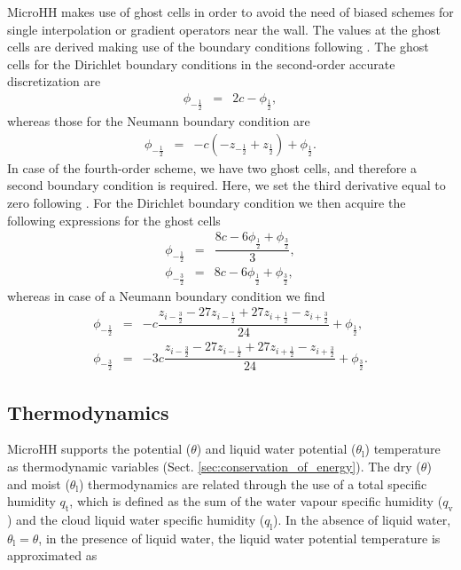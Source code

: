 \documentclass[gmd,manuscript]{copernicus}
\begin{document}
MicroHH makes use of ghost cells in order to avoid the need of biased schemes for single interpolation or gradient operators near the wall. The values at the ghost cells are derived making use of the boundary conditions following \citet{Morinishi1998}. The ghost cells for the Dirichlet boundary conditions in the second-order accurate discretization are
\begin{eqnarray}
\phi_{-\frac{1}{2}} & = & 2 c - \phi_{\frac{1}{2}},
\end{eqnarray}
whereas those for the Neumann boundary condition are
\begin{eqnarray}
\phi_{-\frac{1}{2}} & = & -c \left( - z_{-\frac{1}{2}} + z_{\frac{1}{2}} \right) + \phi_{\frac{1}{2}}.
\end{eqnarray}
In case of the fourth-order scheme, we have two ghost cells, and therefore a second boundary condition is required. Here, we set the third derivative equal to zero following \citep{Morinishi1998}. For the Dirichlet boundary condition we then acquire the following expressions for the ghost cells
\begin{eqnarray}
\phi_{-\frac{1}{2}} & = & \dfrac{8 c - 6 \phi_{\frac{1}{2}} + \phi_{\frac{3}{2}}}{3},\\
\phi_{-\frac{3}{2}} & = & 8 c - 6 \phi_{\frac{1}{2}} + \phi_{\frac{3}{2}},
\end{eqnarray}
whereas in case of a Neumann boundary condition we find
\begin{eqnarray}
\phi_{-\frac{1}{2}} & = & -c  \dfrac{z_{i-\frac{3}{2}} - 27 z_{i-\frac{1}{2}} + 27 z_{i+\frac{1}{2}} - z_{i+\frac{3}{2}}}{24} + \phi_{\frac{1}{2}},\\
\phi_{-\frac{3}{2}} & = & -3c \dfrac{z_{i-\frac{3}{2}} - 27 z_{i-\frac{1}{2}} + 27 z_{i+\frac{1}{2}} - z_{i+\frac{3}{2}}}{24} + \phi_{\frac{3}{2}}.
\end{eqnarray}

\subsection{Thermodynamics}\label{sec:thermo}
MicroHH supports the potential  ($\theta$) and liquid water potential ($\theta_\mathrm{l}$) temperature as thermodynamic variables (Sect. \ref{sec:conservation_of_energy}). The dry ($\theta$) and moist ($\theta_\mathrm{l}$) thermodynamics are related through the use of a total specific humidity $q_\mathrm{t}$, which is defined as the sum of the water vapour specific humidity ($q_\mathrm{v}$) and the cloud liquid water specific humidity ($q_\mathrm{l}$). In the absence of liquid water, $\theta_\mathrm{l} = \theta$, in the presence of liquid water, the liquid water potential temperature is approximated as \citep{Betts1973}
\end{document}
